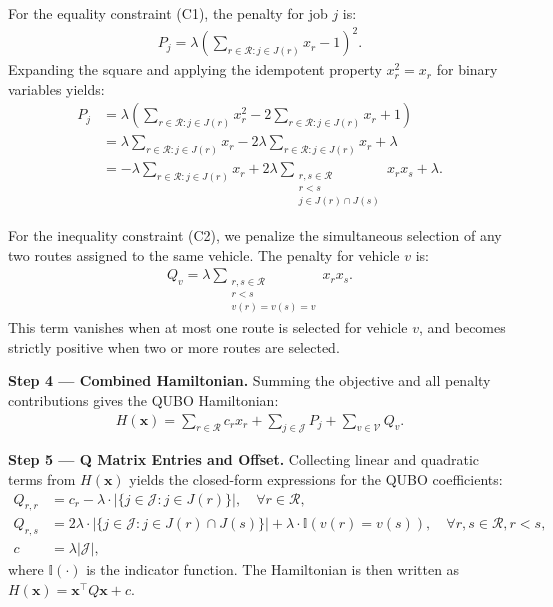 \documentclass[12pt]{article}
\begin{document}
For the equality constraint (C1), the penalty for job $j$ is:
\begin{align}
P_j = \lambda \left( \sum_{r \in \mathcal{R}: j \in J(r)} x_r - 1 \right)^2.
\end{align}
Expanding the square and applying the idempotent property $x_r^2 = x_r$ for binary variables yields:
\begin{align}
P_j &= \lambda \left( \sum_{r \in \mathcal{R}: j \in J(r)} x_r^2 - 2 \sum_{r \in \mathcal{R}: j \in J(r)} x_r + 1 \right) \\
&= \lambda \sum_{r \in \mathcal{R}: j \in J(r)} x_r - 2\lambda \sum_{r \in \mathcal{R}: j \in J(r)} x_r + \lambda \\
&= -\lambda \sum_{r \in \mathcal{R}: j \in J(r)} x_r + 2\lambda \sum_{\substack{r, s \in \mathcal{R} \\ r < s \\ j \in J(r) \cap J(s)}} x_r x_s + \lambda.
\end{align}

For the inequality constraint (C2), we penalize the simultaneous selection of any two routes assigned to the same vehicle. The penalty for vehicle $v$ is:
\begin{align}
Q_v = \lambda \sum_{\substack{r, s \in \mathcal{R} \\ r < s \\ v(r) = v(s) = v}} x_r x_s.
\end{align}
This term vanishes when at most one route is selected for vehicle $v$, and becomes strictly positive when two or more routes are selected.

\textbf{Step 4 --- Combined Hamiltonian.} Summing the objective and all penalty contributions gives the QUBO Hamiltonian:
\begin{align}
H(\mathbf{x}) = \sum_{r \in \mathcal{R}} c_r x_r + \sum_{j \in \mathcal{J}} P_j + \sum_{v \in \mathcal{V}} Q_v.
\end{align}

\textbf{Step 5 --- Q Matrix Entries and Offset.} Collecting linear and quadratic terms from $H(\mathbf{x})$ yields the closed-form expressions for the QUBO coefficients:
\begin{align}
Q_{r,r} &= c_r - \lambda \cdot |\{j \in \mathcal{J} : j \in J(r)\}|, \quad \forall r \in \mathcal{R}, \\
Q_{r,s} &= 2\lambda \cdot |\{j \in \mathcal{J} : j \in J(r) \cap J(s)\}| + \lambda \cdot \mathbb{I}(v(r) = v(s)), \quad \forall r, s \in \mathcal{R}, r < s, \\
c &= \lambda |\mathcal{J}|,
\end{align}
where $\mathbb{I}(\cdot)$ is the indicator function. The Hamiltonian is then written as $H(\mathbf{x}) = \mathbf{x}^\top Q \mathbf{x} + c$.
\end{document}
